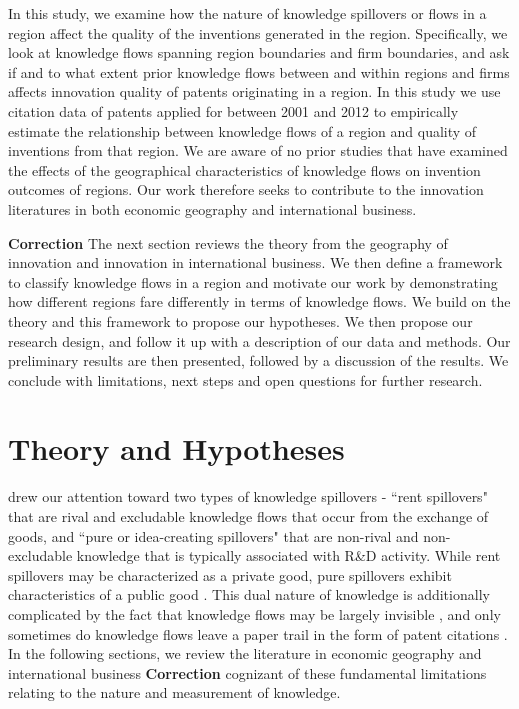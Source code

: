 \documentclass[12pt,letterpaper]{article}
\begin{document}
In this study, we examine how the nature of knowledge spillovers or flows in a region affect the quality of the inventions generated in the region. Specifically, we look at knowledge flows spanning region boundaries and firm boundaries, and ask if and to what extent prior knowledge flows between and within regions and firms affects innovation quality of patents originating in a region. In this study we use citation data of patents applied for between 2001 and 2012 to empirically estimate the relationship between knowledge flows of a region and quality of inventions from that region. We are aware of no prior studies that have examined the effects of the geographical characteristics of knowledge flows on invention outcomes of regions. Our work therefore seeks to contribute to the innovation literatures in both economic geography and international business. \par 


\textbf{Correction}
The next section reviews the theory from the geography of innovation and innovation in international business. We then define a framework to classify knowledge flows in a region and motivate our work by demonstrating how different regions fare differently in terms of knowledge flows. We build on the theory and this framework to propose our hypotheses. We then propose our research design, and follow it up with a description of our data and methods. Our preliminary results are then presented, followed by a discussion of the results. We conclude with limitations, next steps and open questions for further research.



\section*{Theory and Hypotheses}
\cite{Griliches1979} drew our attention toward two types of knowledge spillovers - ``rent spillovers" that  are rival and excludable knowledge flows that occur from the exchange of goods, and ``pure or idea-creating spillovers"  that are non-rival and non-excludable knowledge that is typically associated with R\&D activity. While rent spillovers may be characterized as a private good, pure spillovers exhibit characteristics of a public good \citep{Arrow1962}.  This dual nature of knowledge is additionally complicated by the fact that knowledge flows may be largely invisible \citep{Krugman1991a}, and only sometimes do knowledge flows leave a paper trail in the form of patent citations \citep{Jaffe1993}. In the following sections, we review the literature in economic geography and international business \textbf{Correction} cognizant of these fundamental limitations relating to the nature and measurement of knowledge.
\end{document}
